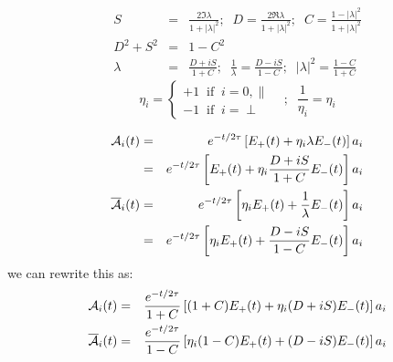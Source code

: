 \documentclass[a4paper,9pt,twoside]{article}
\begin{document}
\begin{eqnarray}
   S &=& \frac{2 \Im \lambda}{1+|\lambda|^2};\;\; D = \frac{2 \Re \lambda}{1+|\lambda|^2};\;\; C = \frac{1-|\lambda|^2 }{1+|\lambda|^2}\\
   D^2+S^2 & = & 1 - C^2 \\
   \lambda & = & \frac{D+iS}{1+C};\;\; \frac{1}{\lambda}  =  \frac{D-iS}{1-C};\;\; |\lambda|^2 = \frac{ 1-C }{ 1+C }
\end{eqnarray}
\begin{equation}
  \eta_i = \left\{ \begin{array}{l} +1 \;\; \mathrm{if}\;\; i=0,\parallel  \\ -1\;\; \mathrm{if}\;\; i=\perp \end{array} \right. \;\;\;;\;\; \frac{1}{\eta_i}=\eta_i
\end{equation}

\begin{eqnarray}
   {\cal A}_i(t)            &=& e^{-t/2\tau} \left[ E_+(t) + \eta_i \lambda E_-(t)  \right] a_i  \\
                            &=&     e^{-t/2\tau} \left[ E_+(t) +\eta_i \frac{D+iS}{1+C} E_-(t)  \right] a_i  \\
   {\overline{\cal A}}_i(t) &=& e^{-t/2\tau} \left[ \eta_i E_+(t) + \frac{1}{\lambda} E_-(t)  \right] a_i    \\
                            &=&     e^{-t/2\tau} \left[\eta_i E_+(t) + \frac{D-iS}{1-C} E_-(t)  \right] a_i   
\end{eqnarray}
we can rewrite this as:
\begin{eqnarray}
   {\cal A}_i(t)           &=&     \frac{e^{-t/2\tau}}{1+C} \left[ (1+C)E_+(t) +\eta_i (D+iS) E_-(t)  \right] a_i  
\\   {\overline{\cal A}}_i(t) &=&    \frac{e^{-t/2\tau}}{1-C} \left[\eta_i (1-C)E_+(t) + (D-iS) E_-(t)  \right] a_i  
\end{eqnarray}
\end{document}
